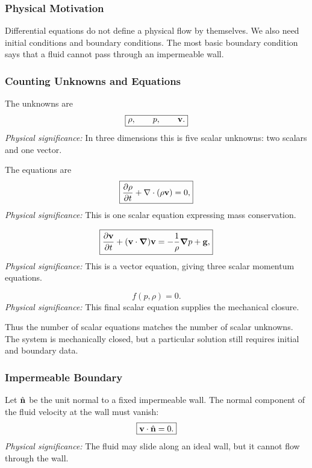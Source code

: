 \documentclass[../main.tex]{subfiles}
\begin{document}
\subsubsection*{Physical Motivation}
Differential equations do not define a physical flow by themselves. We also need initial conditions and boundary conditions. The most basic boundary condition says that a fluid cannot pass through an impermeable wall.

\subsubsection{Counting Unknowns and Equations}\label{subsec:lec12:counting}
The unknowns are
\begin{equation}
  \boxed{\rho,\qquad p,\qquad \mathbf{v}.}
  \label{eq:lec12_unknowns}
\end{equation}
\textit{Physical significance:} In three dimensions this is five scalar unknowns: two scalars and one vector.

The equations are
\begin{equation}
  \boxed{
  \pdv{\rho}{t}+\nabla \cdot(\rho\mathbf{v})=0,}
  \label{eq:lec12_closed_continuity}
\end{equation}
\textit{Physical significance:} This is one scalar equation expressing mass conservation.

\begin{equation}
  \boxed{
  \pdv{\mathbf{v}}{t}
  +
  (\mathbf{v}\cdot\grad)\mathbf{v}
  =
  -\frac{1}{\rho}\grad p+\mathbf{g},}
  \label{eq:lec12_closed_euler}
\end{equation}
\textit{Physical significance:} This is a vector equation, giving three scalar momentum equations.

\begin{equation}
  \boxed{f(p,\rho)=0.}
  \label{eq:lec12_closed_eos}
\end{equation}
\textit{Physical significance:} This final scalar equation supplies the mechanical closure.

Thus the number of scalar equations matches the number of scalar unknowns. The system is mechanically closed, but a particular solution still requires initial and boundary data.

\subsubsection{Impermeable Boundary}\label{subsec:lec12:impermeable-boundary}
Let $\hat{\mathbf{n}}$ be the unit normal to a fixed impermeable wall. The normal component of the fluid velocity at the wall must vanish:
\begin{equation}
  \boxed{\mathbf{v}\cdot\hat{\mathbf{n}}=0.}
  \label{eq:lec12_impermeable_boundary}
\end{equation}
\textit{Physical significance:} The fluid may slide along an ideal wall, but it cannot flow through the wall.
\end{document}
